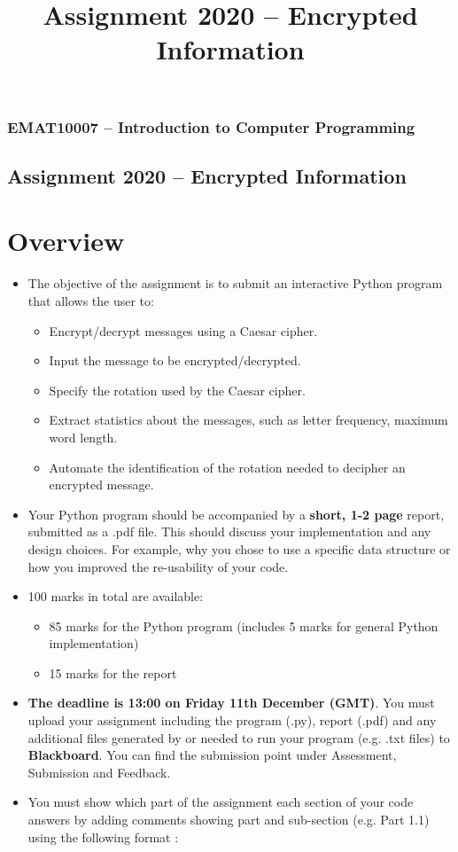 \documentclass[11pt]{report}
\begin{document}
\title{Assignment 2020 -- Encrypted Information}
\subsubsection*{EMAT10007 -- Introduction to Computer Programming}
\subsection*{\Large Assignment 2020 -- Encrypted Information}

\section*{Overview}
\begin{itemize}
	\item The objective of the assignment is to submit an interactive Python program that allows the user to:
	\begin{itemize}
		\item Encrypt/decrypt messages using a Caesar cipher.
		\item Input the message to be encrypted/decrypted.
		\item Specify the rotation used by the Caesar cipher.
		\item Extract statistics about the messages, such as letter frequency, maximum word length.
 		\item Automate the identification of the rotation needed to decipher an encrypted message.
	\end{itemize}
	\item Your Python program should be accompanied by a {\bf short, 1-2 page} report, submitted as a .pdf file. This should discuss your implementation and any design choices. For example, why you chose to use a specific data structure or how you improved the re-usability of your code. 
	\item 100 marks in total are available:
	\begin{itemize}
	    \item 85 marks for the Python program (includes 5 marks for general Python implementation) 
	    \item 15 marks for the report
	\end{itemize}
	 
 	\item \textbf{The \textbf{deadline is 13:00 on Friday 11th December (GMT)}}. You must upload your assignment including the program (.py), report (.pdf) and any additional files generated by or needed to run your program (e.g. .txt files) to \textbf{Blackboard}. You can find the submission point under Assessment, Submission and Feedback.
	\item You must show which part of the assignment each section of your code answers by adding comments showing part and sub-section (e.g. Part 1.1) using the following format :


\end{itemize}
\end{document}
